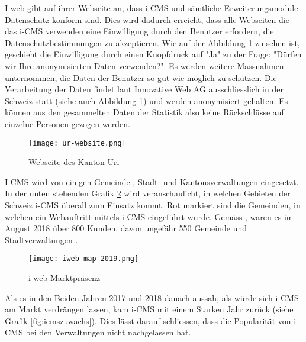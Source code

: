 I-web gibt auf ihrer Webseite \parencite{iwebwebsiteKanotonWeb} an, dass i-CMS und sämtliche Erweiterungsmodule Datenschutz konform sind. Dies wird dadurch erreicht, dass alle Webseiten die das i-CMS verwenden eine Einwilligung durch den Benutzer erfordern, die Datenschutzbestimmungen zu akzeptieren. Wie auf der Abbildung \ref{fig: urweb} zu sehen ist, geschieht die Einwilligung durch einen Knopfdruck auf "Ja" zu der Frage: "Dürfen wir Ihre anonymisierten Daten verwenden?". Es werden weitere Massnahmen unternommen, die Daten der Benutzer so gut wie möglich zu schützen. Die Verarbeitung der Daten findet laut Innovative Web AG \parencite{iwebwebsiteCMS} ausschliesslich in der Schweiz statt (siehe auch Abbildung \ref{fig: urweb}) und werden anonymisiert gehalten. Es können aus den gesammelten Daten der Statistik also keine Rückschlüsse auf einzelne Personen gezogen werden. 

\begin{figure}[h]
  \centering
  \texttt{[image: ur-website.png]}
  \caption{Webseite des Kanton Uri \parencite{webseiteKantonUri}}
  \label{fig: urweb}
\end{figure}

I-CMS wird von einigen Gemeinde-, Stadt- und Kantonsverwaltungen eingesetzt. In der unten stehenden Grafik \ref{fig: iwebmap2019} wird veranschaulicht, in welchen Gebieten der Schweiz i-CMS überall zum Einsatz kommt. Rot markiert sind die Gemeinden, in welchen ein Webauftritt mittels i-CMS eingeführt wurde. Gemäss \parencite[S. 14]{iweb2018revue}, waren es im August 2018 über 800 Kunden, davon ungefähr 550 Gemeinde und Stadtverwaltungen \parencite{iwebwebsiteGemeindeWeb}.

\begin{figure}[h]
  \centering
  \texttt{[image: iweb-map-2019.png]}
  \caption{i-web Marktpräsenz \parencite[S. 14]{iweb2019revue}}
  \label{fig: iwebmap2019}
\end{figure}

Als es in den Beiden Jahren 2017 und 2018 danach aussah, als würde sich i-CMS am Markt verdrängen lassen, kam i-CMS mit einem Starken Jahr zurück (siehe Grafik \ref{fig:icmszuwachs}). Dies lässt darauf schliessen, dass die Popularität von i-CMS bei den Verwaltungen nicht nachgelassen hat.


